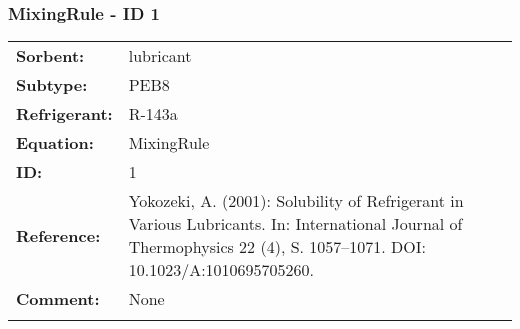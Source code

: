 \FloatBarrier
\newpage
\subsubsection{MixingRule - ID 1}
%
\begin{tabular}[l]{|lp{11.5cm}|}
\hline
\addlinespace

\textbf{Sorbent:} & lubricant \\
\textbf{Subtype:} & PEB8 \\
\textbf{Refrigerant:} & R-143a \\
\textbf{Equation:} & MixingRule \\
\textbf{ID:} & 1 \\
\textbf{Reference:} & Yokozeki, A. (2001): Solubility of Refrigerant in Various Lubricants. In: International Journal of Thermophysics 22 (4), S. 1057–1071. DOI: 10.1023/A:1010695705260. \\
\textbf{Comment:} & None \\

\addlinespace
\hline
\end{tabular}
\newline

